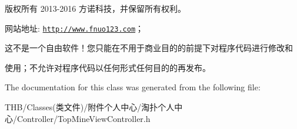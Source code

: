 版权所有 2013-\/2016 方诺科技，并保留所有权利。

网站地址\+: \href{http://www.fnuo123.com}{\tt http\+://www.\+fnuo123.\+com}； 



这不是一个自由软件！您只能在不用于商业目的的前提下对程序代码进行修改和

使用；不允许对程序代码以任何形式任何目的的再发布。 

 

The documentation for this class was generated from the following file\+:\begin{DoxyCompactItemize}
\item 
T\+H\+B/\+Classes(类文件)/附件个人中心/淘扑个人中心/\+Controller/Top\+Mine\+View\+Controller.\+h\end{DoxyCompactItemize}
